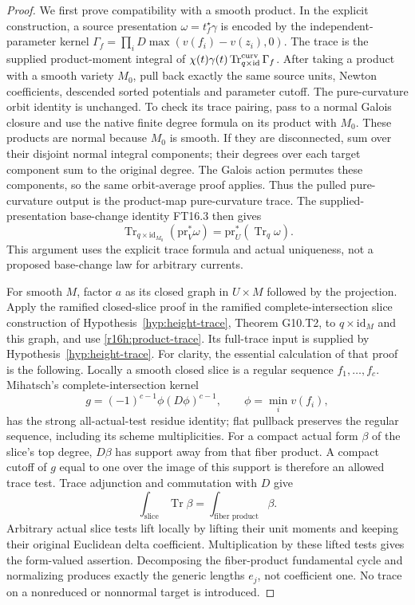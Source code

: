 \documentclass[11pt,a4paper]{article}
\theoremstyle{definition}
\theoremstyle{remark}
\numberwithin{equation}{section}
\begin{document}
\begin{proof}
We first prove compatibility with a smooth product. In the explicit
construction, a source presentation $\omega=t_f^\star\gamma$ is encoded by
the independent-parameter kernel
$\Gamma_f=\prod_iD\max(v(f_i)-v(z_i),0)$. The trace is the supplied
product-moment integral of
$\chi(t)\gamma(t)\operatorname{Tr}^{\rm curv}_{q\times\mathrm{id}}\Gamma_f$.
After taking a product with a smooth variety $M_0$, pull back exactly the
same source units, Newton coefficients, descended sorted potentials and
parameter cutoff. The pure-curvature orbit identity is unchanged.
To check its trace pairing, pass to a normal Galois closure and use the
native finite degree formula on its product with $M_0$. These products
are normal because $M_0$ is smooth. If they are disconnected, sum over
their disjoint normal integral components; their degrees over each
target component sum to the original degree. The Galois action permutes
these components, so the same orbit-average proof applies. Thus the
pulled pure-curvature output is the product-map pure-curvature trace.
The supplied-presentation base-change identity FT16.3 then gives
\[
 \operatorname{Tr}_{q\times\mathrm{id}_{M_0}}(\mathrm{pr}_V^*\omega)
             =\mathrm{pr}_U^*(\operatorname{Tr}_q\omega).
 \tag{H16.2}\label{r16h:product-trace}
\]
This argument uses the explicit trace formula and actual uniqueness,
not a proposed base-change law for arbitrary currents.

For smooth $M$, factor $a$ as its closed graph in $U\times M$ followed
by the projection. Apply the ramified closed-slice proof in
the ramified complete-intersection slice construction of Hypothesis~\ref{hyp:height-trace},
Theorem G10.T2, to $q\times\mathrm{id}_M$ and this graph, and use
\eqref{r16h:product-trace}. Its full-trace input is supplied by Hypothesis~\ref{hyp:height-trace}. For clarity, the essential calculation of that
proof is the following. Locally a smooth closed slice is a regular
sequence $f_1,\ldots,f_c$. Mihatsch's complete-intersection kernel
\[
 g=(-1)^{c-1}\phi(D\phi)^{c-1},\qquad \phi=\min_i v(f_i),
\]
has the strong all-actual-test residue identity; flat pullback preserves
the regular sequence, including its scheme multiplicities. For a compact
actual form $\beta$ of the slice's top degree, $D\beta$ has support away
from that fiber product. A compact cutoff of $g$ equal to one over the
image of this support is therefore an allowed trace test. Trace
adjunction and commutation with $D$ give
\[
 \int_{\text{slice}}\operatorname{Tr}\beta
                   =\int_{\text{fiber product}}\beta.
\]
Arbitrary actual slice tests lift locally by lifting their unit moments
and keeping their original Euclidean delta coefficient. Multiplication
by these lifted tests gives the form-valued assertion. Decomposing the
fiber-product fundamental cycle and normalizing produces exactly the
generic lengths $e_j$, not coefficient one. No trace on a nonreduced
or nonnormal target is introduced.


\end{proof}
\end{document}
